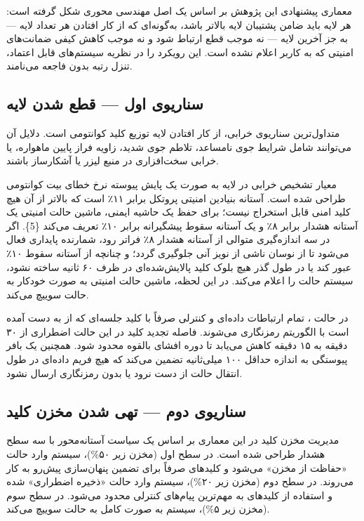 \documentclass[a4paper,14pt]{extreport}
\begin{document}
معماری پیشنهادی این پژوهش بر اساس یک اصل مهندسی محوری شکل گرفته است: هر لایه باید ضامن پشتیبان  لایه بالاتر باشد، به‌گونه‌ای که از کار افتادن هر تعداد لایه --- به جز آخرین لایه --- نه موجب قطع ارتباط شود و نه موجب کاهش کیفی ضمانت‌های امنیتی که به کاربر اعلام نشده است. این رویکرد را در نظریه سیستم‌های قابل اعتماد، تنزل رتبه بدون فاجعه  می‌نامند.

\subsection{سناریوی اول --- قطع شدن لایه }

متداول‌ترین سناریوی خرابی، از کار افتادن لایه توزیع کلید کوانتومی است. دلایل آن می‌توانند شامل شرایط جوی نامساعد، تلاطم جوی شدید، زاویه فراز پایین ماهواره، یا خرابی سخت‌افزاری در منبع لیزر یا آشکارساز باشند.

معیار تشخیص خرابی در لایه  به صورت یک پایش پیوسته نرخ خطای بیت کوانتومی  طراحی شده است. آستانه بنیادین امنیتی پروتکل  برابر ۱۱٪ است که بالاتر از آن هیچ کلید امنی قابل استخراج نیست؛ برای حفظ یک حاشیه ایمنی، ماشین حالت امنیتی یک آستانه هشدار  برابر ۸٪ و یک آستانه سقوط پیشگیرانه  برابر ۱۰٪ تعریف می‌کند \{5\}. اگر  در سه اندازه‌گیری متوالی از آستانه هشدار ۸٪ فراتر رود، شمارنده پایداری  فعال می‌شود تا از نوسان ناشی از نویز آنی جلوگیری گردد؛ و چنانچه  از آستانه سقوط ۱۰٪ عبور کند یا در طول گذر هیچ بلوک کلید پالایش‌شده‌ای در ظرف ۶۰ ثانیه ساخته نشود، سیستم حالت  را اعلام می‌کند. در این لحظه، ماشین حالت امنیتی  به صورت خودکار به حالت  سوییچ می‌کند.

در حالت ، تمام ارتباطات داده‌ای و کنترلی صرفاً با کلید جلسه‌ای که از  به دست آمده است با الگوریتم  رمزنگاری می‌شوند. فاصله تجدید کلید در این حالت اضطراری از ۳۰ دقیقه به ۱۵ دقیقه کاهش می‌یابد تا دوره افشای بالقوه محدود شود. همچنین یک بافر پیوستگی  به اندازه حداقل ۱۰۰ میلی‌ثانیه تضمین می‌کند که هیچ فریم داده‌ای در طول انتقال حالت از دست نرود یا بدون رمزنگاری ارسال نشود.

\subsection{سناریوی دوم --- تهی شدن مخزن کلید}

مدیریت مخزن کلید  در این معماری بر اساس یک سیاست آستانه‌محور  با سه سطح هشدار طراحی شده است. در سطح اول (مخزن زیر ۵۰\%)، سیستم وارد حالت «حفاظت از مخزن» می‌شود و کلیدهای  صرفاً برای تضمین پنهان‌سازی پیش‌رو  به کار می‌روند. در سطح دوم (مخزن زیر ۲۰\%)، سیستم وارد حالت «ذخیره اضطراری» شده و استفاده از کلیدهای  به مهم‌ترین پیام‌های کنترلی محدود می‌شود. در سطح سوم (مخزن زیر ۵\%)، سیستم به صورت کامل به حالت  سوییچ می‌کند.
\end{document}
